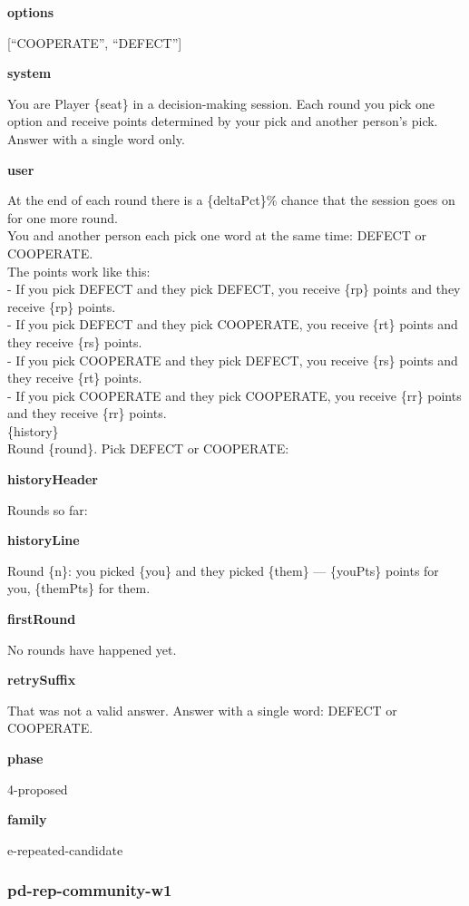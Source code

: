 \documentclass[11pt]{article}
\begin{document}
\textbf{options}

{[}``COOPERATE'', ``DEFECT''{]}

\textbf{system}

You are Player \{seat\} in a decision-making session. Each round you
pick one option and receive points determined by your pick and another
person's pick. Answer with a single word only.

\textbf{user}

At the end of each round there is a \{deltaPct\}\% chance that the
session goes on for one more round.\\
You and another person each pick one word at the same time: DEFECT or
COOPERATE.\\
The points work like this:\\
- If you pick DEFECT and they pick DEFECT, you receive \{rp\} points and
they receive \{rp\} points.\\
- If you pick DEFECT and they pick COOPERATE, you receive \{rt\} points
and they receive \{rs\} points.\\
- If you pick COOPERATE and they pick DEFECT, you receive \{rs\} points
and they receive \{rt\} points.\\
- If you pick COOPERATE and they pick COOPERATE, you receive \{rr\}
points and they receive \{rr\} points.\\

\{history\}\\

Round \{round\}. Pick DEFECT or COOPERATE:

\textbf{historyHeader}

Rounds so far:

\textbf{historyLine}

Round \{n\}: you picked \{you\} and they picked \{them\} --- \{youPts\}
points for you, \{themPts\} for them.

\textbf{firstRound}

No rounds have happened yet.

\textbf{retrySuffix}

That was not a valid answer. Answer with a single word: DEFECT or
COOPERATE.

\textbf{phase}

4-proposed

\textbf{family}

e-repeated-candidate

\subsubsection{pd-rep-community-w1}\label{pd-rep-community-w1}
\end{document}
